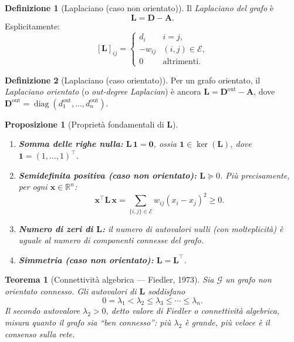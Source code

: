 \documentclass[a4paper,11pt]{article}
\theoremstyle{definition}
\newtheorem{defn}{Definizione}[section]
\theoremstyle{plain}
\newtheorem{thm}{Teorema}[section]
\newtheorem{prop}{Proposizione}[section]
\theoremstyle{remark}
\newcommand{\R}{\mathbb{R}}
\newcommand{\mat}[1]{\mathbf{#1}}
\newcommand{\vect}[1]{\bm{#1}}
\newcommand{\ones}{\mathbf{1}}
\newcommand{\zeros}{\mathbf{0}}
\DeclareMathOperator{\diag}{diag}
\DeclareMathOperator{\Ker}{ker}
\begin{document}
\begin{defn}[Laplaciano (caso non orientato)]
Il \emph{Laplaciano del grafo} è
\[
  \mat{L} = \mat{D} - \mat{A}.
\]
Esplicitamente:
\[
  [\mat{L}]_{ij} =
  \begin{cases}
    d_i      & i = j,\\
    -w_{ij}  & (i,j) \in \mathcal{E},\\
    0         & \text{altrimenti.}
  \end{cases}
\]
\end{defn}

\begin{defn}[Laplaciano (caso orientato)]
Per un grafo orientato, il \emph{Laplaciano orientato} (o \emph{out-degree
Laplacian}) è ancora $\mat{L} = \mat{D}^{\text{out}} - \mat{A}$, dove
$\mat{D}^{\text{out}} = \diag(d_1^{\text{out}}, \ldots, d_n^{\text{out}})$.
\end{defn}

\begin{prop}[Proprietà fondamentali di $\mat{L}$]
\label{prop:laplacian}
\begin{enumerate}[label=(\roman*), noitemsep]
  \item \textbf{Somma delle righe nulla:} $\mat{L}\,\ones = \zeros$,
        ossia $\ones \in \Ker(\mat{L})$, dove $\ones = (1,\ldots,1)^\top$.
  \item \textbf{Semidefinita positiva (caso non orientato):} $\mat{L} \succeq 0$.
        Più precisamente, per ogni $\vect{x} \in \R^n$:
        \[
          \vect{x}^\top \mat{L}\, \vect{x}
          = \sum_{\{i,j\}\in\mathcal{E}} w_{ij}(x_i - x_j)^2 \geq 0.
        \]
  \item \textbf{Numero di zeri di $\mat{L}$:} il numero di autovalori nulli
        (con molteplicità) è uguale al numero di componenti connesse del grafo.
  \item \textbf{Simmetria (caso non orientato):} $\mat{L} = \mat{L}^\top$.
\end{enumerate}
\end{prop}

\begin{thm}[Connettività algebrica --- Fiedler, 1973]
Sia $\mathcal{G}$ un grafo non orientato connesso. Gli autovalori di $\mat{L}$
soddisfano
\[
  0 = \lambda_1 < \lambda_2 \leq \lambda_3 \leq \cdots \leq \lambda_n.
\]
Il secondo autovalore $\lambda_2 > 0$, detto \emph{valore di Fiedler} o
\emph{connettività algebrica}, misura quanto il grafo sia ``ben connesso'':
più $\lambda_2$ è grande, più veloce è il consenso sulla rete.
\end{thm}
\end{document}
